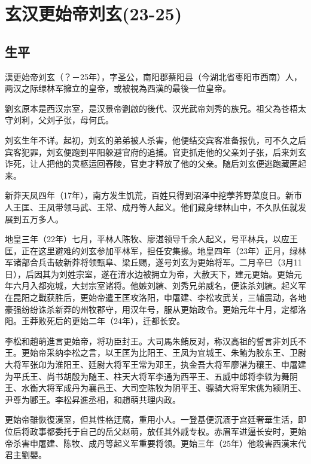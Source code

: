 
\section{玄汉更始帝刘玄\tiny(23-25)}

\subsection{生平}

漢更始帝刘玄（？－25年），字圣公，南阳郡蔡阳县（今湖北省枣阳市西南）人，两汉之际绿林军擁立的皇帝，或被視為西漢的最後一位皇帝。

劉玄原本是西汉宗室，是汉景帝劉啟的後代、汉光武帝刘秀的族兄。祖父為苍梧太守刘利，父刘子张，母何氏。

刘玄生年不详。起初，刘玄的弟弟被人杀害，他便结交宾客准备报仇，可不久之后宾客犯罪，刘玄便跑到平阳躲避官府的追捕。官吏抓走他的父亲刘子张，后来刘玄诈死，让人把他的灵柩运回舂陵，官吏才释放了他的父亲。随后刘玄便逃跑藏匿起来。

新莽天凤四年（17年），南方发生饥荒，百姓只得到沼泽中挖荸荠野菜度日。新市人王匡、王凤带领马武、王常、成丹等人起义。他们藏身绿林山中，不久队伍就发展到五万多人。

地皇三年（22年）七月，平林人陈牧、廖湛领导千余人起义，号平林兵，以应王匡，正在这里避难的刘玄参加平林军，担任安集掾。地皇四年（23年）正月，绿林军诸部合兵击破新莽将领甄阜、梁丘赐，遂号刘玄为更始将军。二月辛巳（3月11日），后因其为刘姓宗室，遂在淯水边被拥立为帝，大赦天下，建元更始。更始元年六月入都宛城，大封宗室诸将。他嫉刘縯、刘秀兄弟威名，便诛杀刘縯。起义军在昆阳之戰获胜后，更始帝遣王匡攻洛阳，申屠建、李松攻武关，三辅震动，各地豪强纷纷诛杀新莽的州牧郡守，用汉年号，服从更始政令。更始元年十月，定都洛阳。王莽败死后的更始二年（24年），迁都长安。

李松和趙萌進言更始帝，将功臣封王。大司馬朱鮪反对，称汉高祖的誓言非刘氏不王。更始帝采纳李松之言，以王匡为比阳王、王凤为宜城王、朱鲔为胶东王、卫尉大将军张卬为淮阳王、廷尉大将军王常为邓王，执金吾大将军廖湛为穰王、申屠建为平氏王、尚书胡殷为随王、柱天大将军李通为西平王、五威中郎将李轶为舞阴王、水衡大将军成丹为襄邑王、大司空陈牧为阴平王、骠骑大将军宋佻为颍阴王、尹尊为郾王。李松昇進丞相，和趙萌共理内政。

更始帝雖恢復漢室，但其性格迂腐，重用小人。一登基便沉湎于宫廷奢華生活，即位后将政事都委托于自己的岳父赵萌，放任其外戚专权。赤眉军进逼长安时，更始帝杀害申屠建、陈牧、成丹等起义军重要将领。更始三年（25年）他殺害西漢末代君主劉嬰。

